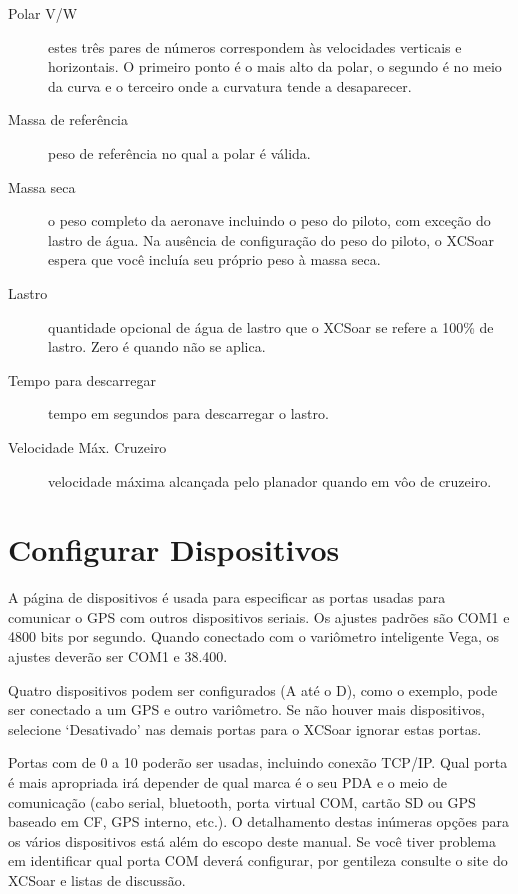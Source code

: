 \begin{description}
\item[Polar V/W]  estes três pares de números correspondem às velocidades verticais e horizontais.  O primeiro ponto é o mais alto da polar, o segundo é no meio da curva e o terceiro onde a curvatura tende a desaparecer.
\item[Massa de referência]  peso de referência no qual a polar é válida.
\item[Massa seca]  o peso completo da aeronave incluindo o peso do piloto, com exceção do lastro de água.  Na ausência de configuração do peso do piloto, o XCSoar espera que você incluía seu próprio peso à massa seca.
\item[Lastro] quantidade opcional de água de lastro que o XCSoar se refere a 100\% de lastro.  Zero é quando não se aplica.
\item[Tempo para descarregar]  tempo em segundos para descarregar o lastro.
\item[Velocidade Máx. Cruzeiro] velocidade máxima alcançada pelo planador quando em vôo de cruzeiro.
\end{description}


\section{Configurar Dispositivos} \label{conf:comdevices}

A página de dispositivos é usada para especificar as portas usadas para 
comunicar o GPS com outros dispositivos seriais.  Os ajustes padrões são COM1 e 4800 bits por segundo.  Quando conectado com o variômetro inteligente Vega, os ajustes deverão ser COM1 e 38.400.

Quatro dispositivos podem ser configurados (A até o D), como o exemplo, pode ser conectado a um GPS e outro variômetro.  Se não houver mais dispositivos, selecione ‘Desativado’ nas demais portas para o XCSoar ignorar estas portas.


Portas com de 0 a 10 poderão ser usadas, incluindo conexão TCP/IP.   Qual porta é mais apropriada irá depender de qual marca é o seu PDA e o meio de comunicação (cabo serial, bluetooth, porta virtual COM, cartão SD ou GPS baseado em CF, GPS interno, etc.).  O detalhamento destas inúmeras opções para os vários dispositivos está além do escopo deste manual.  Se você tiver problema em identificar qual porta COM deverá configurar, por gentileza consulte o site do XCSoar e listas de discussão.  

